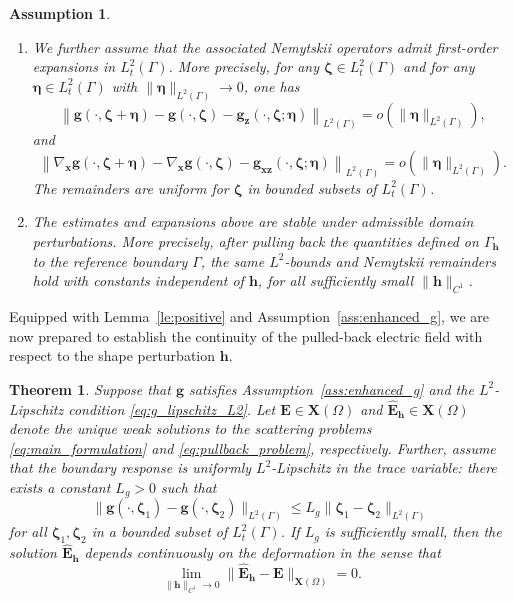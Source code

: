 \documentclass[10pt,a4paper]{amsart}
\newtheorem{theo}{Theorem}[section]
\newtheorem{assu}{Assumption}
\numberwithin{equation}{section}
\begin{document}
\begin{assu}
\begin{enumerate}
\item[\textup{(A3)}]
We further assume that the associated Nemytskii operators admit first-order
expansions in \(L_t^2(\Gamma)\). More precisely, for any
\(\boldsymbol\zeta\in L_t^2(\Gamma)\) and for any
\(\boldsymbol\eta\in L_t^2(\Gamma)\) with
\(\|\boldsymbol\eta\|_{L^2(\Gamma)}\to0\), one has
\[
\left\|\mathbf g(\cdot,\boldsymbol\zeta+\boldsymbol\eta)-
\mathbf g(\cdot,\boldsymbol\zeta)-\mathbf g_{\boldsymbol z}
(\cdot,\boldsymbol\zeta;\boldsymbol\eta)
\right\|_{L^2(\Gamma)}
=o(\|\boldsymbol\eta\|_{L^2(\Gamma)}),
\]
and
\[
\left\|\nabla_{\boldsymbol x}\mathbf g
(\cdot,\boldsymbol\zeta+\boldsymbol\eta)-
\nabla_{\boldsymbol x}\mathbf g(\cdot,\boldsymbol\zeta)
-\mathbf g_{\boldsymbol x\boldsymbol z}
(\cdot,\boldsymbol\zeta;\boldsymbol\eta)
\right\|_{L^2(\Gamma)}
=o(\|\boldsymbol\eta\|_{L^2(\Gamma)}).
\]
The remainders are uniform for
\(\boldsymbol\zeta\) in bounded subsets of \(L_t^2(\Gamma)\).
\item[\textup{(A4)}]
The estimates and expansions above are stable under admissible domain
perturbations. More precisely, after pulling back the quantities defined on
\(\Gamma_{\mathbf h}\) to the reference boundary \(\Gamma\), the same
\(L^2\)-bounds and Nemytskii remainders hold with constants independent of
\(\mathbf h\), for all sufficiently small \(\|\mathbf h\|_{C^1}\).
\end{enumerate}
\end{assu}
Equipped with Lemma~\ref{le:positive} and Assumption~\ref{ass:enhanced_g}, we are now prepared to establish the continuity of the pulled-back electric field with respect to the shape perturbation $\mathbf{h}$.

\begin{theo}\label{th:continuity_domain_dependence}
Suppose that $\mathbf{g}$ satisfies Assumption~\ref{ass:enhanced_g} and the $L^2$-Lipschitz condition \eqref{eq:g_lipschitz_L2}. Let $\mathbf{E} \in \mathbf{X}(\Omega)$ and $\hat{\mathbf{E}}_{\mathbf{h}} \in \mathbf{X}(\Omega)$ denote the unique weak solutions to the scattering problems \eqref{eq:main_formulation} and \eqref{eq:pullback_problem}, respectively. Further, assume that the boundary response is uniformly $L^2$-Lipschitz in the trace variable: there exists a constant $L_g > 0$ such that
\[
\|\mathbf{g}(\cdot, \boldsymbol{\zeta}_1) - \mathbf{g}(\cdot, \boldsymbol{\zeta}_2)\|_{L^2(\Gamma)} \le L_g \|\boldsymbol{\zeta}_1 - \boldsymbol{\zeta}_2\|_{L^2(\Gamma)}
\]
for all $\boldsymbol{\zeta}_1, \boldsymbol{\zeta}_2$ in a bounded subset of $L_t^2(\Gamma)$. If $L_g$ is sufficiently small, then the solution $\hat{\mathbf{E}}_{\mathbf{h}}$ depends continuously on the deformation in the sense that
\begin{equation}
\label{eq:continuity_limit}
\lim_{\|\mathbf{h}\|_{C^1} \to 0} \|\hat{\mathbf{E}}_{\mathbf{h}} - \mathbf{E}\|_{\mathbf{X}(\Omega)} = 0.
\end{equation}
\end{theo}
\end{document}
